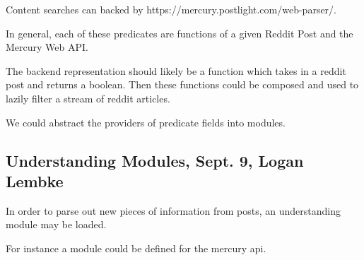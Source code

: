 \documentclass{article}
\begin{document}
Content searches can backed by https://mercury.postlight.com/web-parser/.

In general, each of these predicates are functions of a given Reddit Post and the Mercury Web API.

The backend representation should likely be a function which takes in a reddit post and returns a boolean. Then these functions could be composed and used to lazily filter a stream of reddit articles.

We could abstract the providers of predicate fields into modules.

\subsection{Understanding Modules, Sept. 9, Logan Lembke}
In order to parse out new pieces of information from posts, an understanding module may be loaded. 

For instance a module could be defined for the mercury api.
\end{document}
